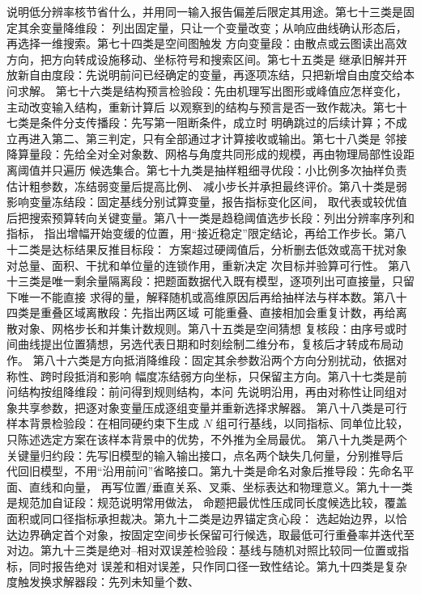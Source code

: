 \documentclass[UTF8,a4paper,12pt]{ctexart}
\begin{document}
说明低分辨率核节省什么，并用同一输入报告偏差后限定其用途。第七十三类是固定其余变量降维段：
列出固定量，只让一个变量改变；从响应曲线确认形态后，再选择一维搜索。第七十四类是空间图触发
方向变量段：由散点或云图读出高效方向，把方向转成设施移动、坐标符号和搜索区间。第七十五类是
继承旧解并开放新自由度段：先说明前问已经确定的变量，再逐项冻结，只把新增自由度交给本问求解。
第七十六类是结构预言检验段：先由机理写出图形或峰值应怎样变化，主动改变输入结构，重新计算后
以观察到的结构与预言是否一致作裁决。第七十七类是条件分支传播段：先写第一阻断条件，成立时
明确跳过的后续计算；不成立再进入第二、第三判定，只有全部通过才计算接收或输出。第七十八类是
邻接降算量段：先给全对全对象数、网格与角度共同形成的规模，再由物理局部性设距离阈值并只遍历
候选集合。第七十九类是抽样粗细寻优段：小比例多次抽样负责估计粗参数，冻结弱变量后提高比例、
减小步长并承担最终评价。第八十类是弱影响变量冻结段：固定基线分别试算变量，报告指标变化区间，
取代表或较优值后把搜索预算转向关键变量。第八十一类是趋稳阈值选步长段：列出分辨率序列和指标，
指出增幅开始变缓的位置，用“接近稳定”限定结论，再给工作步长。第八十二类是达标结果反推目标段：
方案超过硬阈值后，分析删去低效或高干扰对象对总量、面积、干扰和单位量的连锁作用，重新决定
次目标并验算可行性。
第八十三类是唯一剩余量隔离段：把题面数据代入既有模型，逐项列出可直接量，只留下唯一不能直接
求得的量，解释随机或高维原因后再给抽样法与样本数。第八十四类是重叠区域离散段：先指出两区域
可能重叠、直接相加会重复计数，再给离散对象、网格步长和并集计数规则。第八十五类是空间猜想
复核段：由序号或时间曲线提出位置猜想，另选代表日期和时刻绘制二维分布，复核后才转成布局动作。
第八十六类是方向抵消降维段：固定其余参数沿两个方向分别扰动，依据对称性、跨时段抵消和影响
幅度冻结弱方向坐标，只保留主方向。第八十七类是前问结构按组降维段：前问得到规则结构，本问
先说明沿用，再由对称性让同组对象共享参数，把逐对象变量压成逐组变量并重新选择求解器。
第八十八类是可行样本背景检验段：在相同硬约束下生成 $N$ 组可行基线，以同指标、同单位比较，
只陈述选定方案在该样本背景中的优势，不外推为全局最优。
第八十九类是两个关键量归约段：先写旧模型的输入输出接口，点名两个缺失几何量，分别推导后
代回旧模型，不用“沿用前问”省略接口。第九十类是命名对象后推导段：先命名平面、直线和向量，
再写位置/垂直关系、叉乘、坐标表达和物理意义。第九十一类是规范加自证段：规范说明常用做法，
命题把最优性压成同长度候选比较，覆盖面积或同口径指标承担裁决。第九十二类是边界锚定贪心段：
选起始边界，以恰达边界确定首个对象，按固定空间步长保留可行候选，取最低可行重叠率并迭代至
对边。第九十三类是绝对--相对双误差检验段：基线与随机对照比较同一位置或指标，同时报告绝对
误差和相对误差，只作同口径一致性结论。第九十四类是复杂度触发换求解器段：先列未知量个数、
\end{document}
